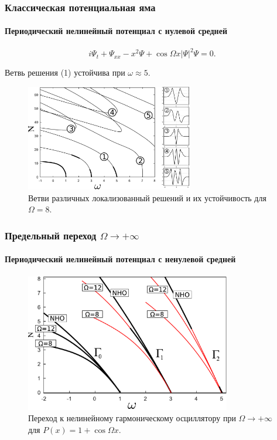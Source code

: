 \documentclass [10pt] {beamer}
\begin{document}
\begin{frame}
	\frametitle{Классическая потенциальная яма}
	\framesubtitle{Периодический нелинейный потенциал с нулевой средней}
	
	\begin{equation}
		i \Psi_t + \Psi_{xx} - x^2 \Psi + \cos \Omega x |\Psi|^2 \Psi = 0.
	\end{equation}

	Ветвь решения {\color{ceruleanblue} (1)} устойчива при $\omega \approx 5$.

	\begin{figure}
		\includegraphics[width=0.65\textwidth]{pic/solution_branches_zero_mean.pdf}
		\caption{Ветви различных локализованный решений и их устойчивость для $\Omega = 8$.}
		\label{pic:branches_zero_mean}
	\end{figure}	
	
\end{frame}

\begin{frame}
	\frametitle{Предельный переход $\Omega \to +\infty$}
	\framesubtitle{Периодический нелинейный потенциал с ненулевой средней}
	
	\begin{figure}
		\includegraphics[width=0.8\textwidth]{pic/nonlinear_oscillator_limit.pdf}
		\caption{Переход к нелинейному гармоническому осциллятору при $\Omega \to +\infty$ для $P(x) = 1 + \cos \Omega x$.}
		\label{pic:nonlinear_limit}
	\end{figure}	
\end{frame}
\end{document}
